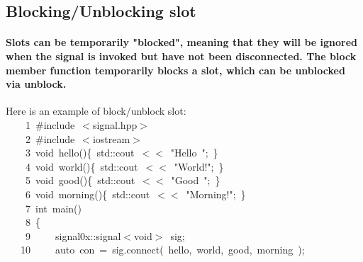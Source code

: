 \documentclass[9pt,onside,a4paper]{article}
\newcommand{\hlstd}[1]{\textcolor[rgb]{0.2,0,0.4}{#1}}
\newcommand{\hlstr}[1]{\textcolor[rgb]{0.09,0.38,0.65}{#1}}
\newcommand{\hlppc}[1]{\textcolor[rgb]{0.33,0.45,0.69}{#1}}
\newcommand{\hlopt}[1]{\textcolor[rgb]{0.33,0.33,0.33}{#1}}
\newcommand{\hllin}[1]{\textcolor[rgb]{0.6,0.6,0.6}{#1}}
\newcommand{\hlkwb}[1]{\textcolor[rgb]{0.96,0.55,0.14}{#1}}
\newcommand{\hlkwc}[1]{\textcolor[rgb]{0,0,1}{#1}}
\newcommand{\hlkwd}[1]{\textcolor[rgb]{0.82,0.11,0.93}{#1}}
\begin{document}
\subsection{Blocking/Unblocking slot}
\paragraph{Slots can be temporarily "blocked", meaning that they will be ignored when the signal is invoked but have not been disconnected. The block member function temporarily blocks a slot, which can be unblocked via unblock.\\}

Here is an example of block/unblock slot: \\

\noindent
\ttfamily
\hlstd{}\hllin{\ \ \ \ 1\ }\hlppc{\#include\ $<$signal.hpp$>$}\\
\hllin{\ \ \ \ 2\ }\hlstd{}\hlppc{\#include\ $<$iostream$>$}\\
\hllin{\ \ \ \ 3\ }\hlstd{}\hlkwb{void\ }\hlstd{}\hlkwd{hello}\hlstd{}\hlopt{()\{\ }\hlstd{std}\hlopt{::}\hlstd{cout\ }\hlopt{$<$$<$\ }\hlstd{}\hlstr{"Hello\ "}\hlstd{}\hlopt{;\ \}}\\
\hllin{\ \ \ \ 4\ }\hlstd{}\hlkwb{void\ }\hlstd{}\hlkwd{world}\hlstd{}\hlopt{()\{\ }\hlstd{std}\hlopt{::}\hlstd{cout\ }\hlopt{$<$$<$\ }\hlstd{}\hlstr{"World!"}\hlstd{}\hlopt{;\ \}}\\
\hllin{\ \ \ \ 5\ }\hlstd{}\hlkwb{void\ }\hlstd{}\hlkwd{good}\hlstd{}\hlopt{()\{\ }\hlstd{std}\hlopt{::}\hlstd{cout\ }\hlopt{$<$$<$\ }\hlstd{}\hlstr{"Good\ "}\hlstd{}\hlopt{;\ \}}\\
\hllin{\ \ \ \ 6\ }\hlstd{}\hlkwb{void\ }\hlstd{}\hlkwd{morning}\hlstd{}\hlopt{()\{\ }\hlstd{std}\hlopt{::}\hlstd{cout\ }\hlopt{$<$$<$\ }\hlstd{}\hlstr{"Morning!"}\hlstd{}\hlopt{;\ \}}\\
\hllin{\ \ \ \ 7\ }\hlstd{}\hlkwb{int\ }\hlstd{}\hlkwd{main}\hlstd{}\hlopt{()}\\
\hllin{\ \ \ \ 8\ }\hlstd{}\hlopt{\{}\\
\hllin{\ \ \ \ 9\ }\hlstd{}\hlstd{\ \ \ \ }\hlstd{signal0x}\hlopt{::}\hlstd{signal}\hlopt{$<$}\hlstd{}\hlkwb{void}\hlstd{}\hlopt{$>$\ }\hlstd{sig}\hlopt{;}\\
\hllin{\ \ \ 10\ }\hlstd{}\hlstd{\ \ \ \ }\hlstd{}\hlkwc{auto\ }\hlstd{con\ }\hlopt{=\ }\hlstd{sig}\hlopt{.}\hlstd{}\hlkwd{connect}\hlstd{}\hlopt{(\ }\hlstd{hello}\hlopt{,\ }\hlstd{world}\hlopt{,\ }\hlstd{good}\hlopt{,\ }\hlstd{morning\ }\hlopt{);}\\
\end{document}
